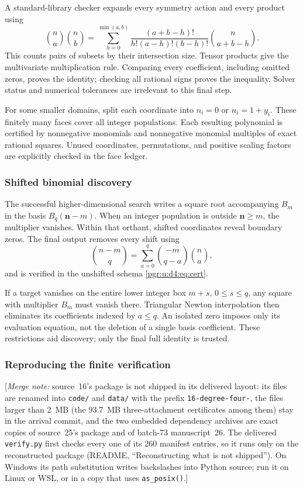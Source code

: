 \documentclass[11pt]{article}
\numberwithin{equation}{section}
\theoremstyle{definition}\newtheorem{definition}[theorem]{Definition}\newtheorem{remark}[theorem]{Remark}
\newcommand{\mnote}[1]{[\textit{Merge note:} #1]}
\begin{document}
A standard-library checker expands every symmetry action and every product using
\[
 \binom na\binom nb=
 \sum_{h=0}^{\min(a,b)}\frac{(a+b-h)!}{h!(a-h)!(b-h)!}
                         \binom n{a+b-h}.
\]
This counts pairs of subsets by their intersection size. Tensor products give the multivariate multiplication rule. Comparing every coefficient, including omitted zeros, proves the identity; checking all rational signs proves the inequality. Solver status and numerical tolerances are irrelevant to this final step.

For some smaller domains, split each coordinate into $n_i=0$ or $n_i=1+y_i$. These finitely many faces cover all integer populations. Each resulting polynomial is certified by nonnegative monomials and nonnegative monomial multiples of exact rational squares. Unused coordinates, permutations, and positive scaling factors are explicitly checked in the face ledger.

\subsubsection{Shifted binomial discovery}
The successful higher-dimensional search writes a square root accompanying $B_m$ in the basis $B_q(\mathbf n-m)$. When an integer population is outside $\mathbf n\ge m$, the multiplier vanishes. Within that orthant, shifted coordinates reveal boundary zeros. The final output removes every shift using
\[
 \binom{n-m}{q}=\sum_{a=0}^q\binom{-m}{q-a}\binom na,
\]
and is verified in the unshifted schema \eqref{pgr:u:d4:eq:cert}.

If a target vanishes on the entire lower integer box $m+s$, $0\le s\le q$, any square with multiplier $B_m$ must vanish there. Triangular Newton interpolation then eliminates its coefficients indexed by $a\le q$. An isolated zero imposes only its evaluation equation, not the deletion of a single basis coefficient. These restrictions aid discovery; only the final full identity is trusted.

\subsubsection{Reproducing the finite verification}

\mnote{source~16's package is not shipped in its delivered layout: its
files are renamed into \texttt{code/} and \texttt{data/} with the prefix
\texttt{16-degree-four-}, the files larger than 2~MB (the 93.7~MB
three-attachment certificates among them) stay in the arrival commit, and
the two embedded dependency archives are exact copies of source~25's
package and of batch-73 manuscript~26. The delivered \texttt{verify.py}
first checks every one of its 260 manifest entries, so it runs only on the
reconstructed package (README, ``Reconstructing what is not shipped''). On
Windows its path substitution writes backslashes into Python source; run
it on Linux or WSL, or in a copy that uses \texttt{as\_posix()}.}
\end{document}
